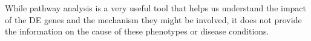 %



While pathway analysis is a very useful tool that helps us understand the impact of the DE genes and the mechanism they might be involved, it does not provide the information on the cause of these phenotypes or disease conditions.

